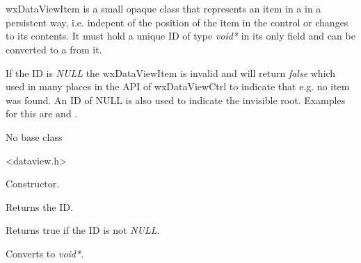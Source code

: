 
\section{}\label{wxdataviewitem}

wxDataViewItem is a small opaque class that represents an
item in a  in a
persistent way, i.e. indepent of the position of the
item in the control or changes to its contents. It must
hold a unique ID of type {\it void*} in its only field
and can be converted to a from it. 

If the ID is {\it NULL} the wxDataViewItem is invalid and 
 will return {\it false}
which used in many places in the API of wxDataViewCtrl
to indicate that e.g. no item was found. An ID of NULL
is also used to indicate the invisible root. Examples
for this are
 and
.



No base class


<dataview.h>




\label{wxdataviewitemwxdataviewitem}


Constructor.



\label{wxdataviewitemgetid}


Returns the ID.

\label{wxdataviewitemisok}


Returns true if the ID is not {\it NULL}.

\label{wxdataviewitemvoid}


Converts to {\it void*}.

